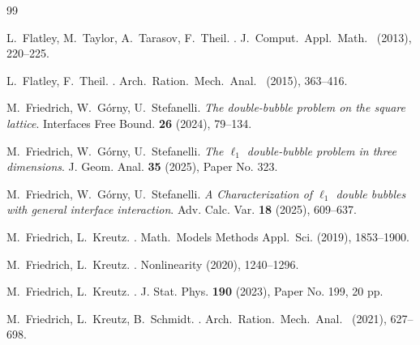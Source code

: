 \documentclass[reqno]{amsart}
\theoremstyle{plain}
\theoremstyle{definition}
\numberwithin{equation}{section}
\begin{document}
\begin{thebibliography}{99}
 
 
 
{\sc L.~Flatley, M.~Taylor, A.~Tarasov, F.~Theil}. 
. 
\newblock J.\ Comput.\ Appl.\ Math.\
 (2013), 220--225.



{\sc L.~Flatley, F.~Theil}. 
. 
\newblock Arch.\ Ration.\ Mech.\ Anal.\
\newblock {\bf 218} (2015), 363--416.



  

{\sc M.~Friedrich, W.~G\'orny, U.~Stefanelli}.
{\em The double-bubble problem on the square lattice}.  Interfaces
Free Bound. {\bf 26} (2024),   79--134.


{\sc M.~Friedrich, W.~G\'orny, U.~Stefanelli}.
{\em The $\ell_1$ double-bubble problem in three
  dimensions}. J. Geom. Anal. {\bf 35} (2025),   Paper
No. 323. 

{\sc M.~Friedrich, W.~G\'orny, U.~Stefanelli}.
{\em A  Characterization of $\ell_1$ double bubbles with general
  interface interaction}. Adv. Calc. Var. {\bf 18} (2025),   609--637. 




 {\sc  M.~Friedrich, L.~Kreutz}.
 .
\newblock  Math.\ Models Methods Appl.\ Sci. 
\newblock {\bf 29} (2019), 1853--1900. 


 



 {\sc  M.~Friedrich, L.~Kreutz}.
 .
 \newblock Nonlinearity
\newblock  {\bf 33} (2020), 1240--1296.


 {\sc  M.~Friedrich, L.~Kreutz}.
 .
  J. Stat. Phys. {\bf 190} (2023),   Paper No. 199, 20 pp. 





 {\sc  M.~Friedrich, L.~Kreutz, B.~Schmidt}.
 .
 \newblock Arch.\ Ration.\ Mech.\ Anal.\
 (2021), 627--698.




\end{thebibliography}
\end{document}
